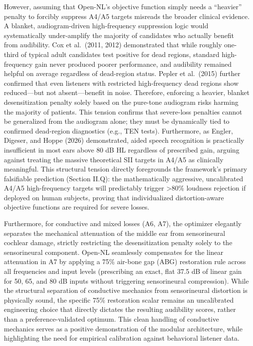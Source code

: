 \documentclass[
  12pt,
]{article}
\begin{document}
However, assuming that Open-NL's objective function simply needs a
``heavier'' penalty to forcibly suppress A4/A5 targets misreads the
broader clinical evidence. A blanket, audiogram-driven high-frequency
suppression logic would systematically under-amplify the majority of
candidates who actually benefit from audibility. Cox et al.~(2011, 2012)
demonstrated that while roughly one-third of typical adult candidates
test positive for dead regions, standard high-frequency gain never
produced poorer performance, and audibility remained helpful on average
regardless of dead-region status. Pepler et al.~(2015) further confirmed
that even listeners with restricted high-frequency dead regions show
reduced---but not absent---benefit in noise. Therefore, enforcing a
heavier, blanket desensitization penalty solely based on the pure-tone
audiogram risks harming the majority of patients. This tension confirms
that severe-loss penalties cannot be generalized from the audiogram
alone; they must be dynamically tied to confirmed dead-region
diagnostics (e.g., TEN tests). Furthermore, as Engler, Digeser, and
Hoppe (2026) demonstrated, aided speech recognition is practically
insufficient in most ears above 80 dB HL regardless of prescribed gain,
arguing against treating the massive theoretical SII targets in A4/A5 as
clinically meaningful. This structural tension directly foregrounds the
framework's primary falsifiable prediction (Section II.Q): the
mathematically aggressive, uncalibrated A4/A5 high-frequency targets
will predictably trigger \textgreater80\% loudness rejection if deployed
on human subjects, proving that individualized distortion-aware
objective functions are required for severe losses.

Furthermore, for conductive and mixed losses (A6, A7), the optimizer
elegantly separates the mechanical attenuation of the middle ear from
sensorineural cochlear damage, strictly restricting the desensitization
penalty solely to the sensorineural component. Open-NL seamlessly
compensates for the linear attenuation in A7 by applying a 75\% air-bone
gap (ABG) restoration rule across all frequencies and input levels
(prescribing an exact, flat 37.5 dB of linear gain for 50, 65, and 80 dB
inputs without triggering sensorineural compression). While the
structural separation of conductive mechanics from sensorineural
distortion is physically sound, the specific 75\% restoration scalar
remains an uncalibrated engineering choice that directly dictates the
resulting audibility scores, rather than a preference-validated optimum.
This clean handling of conductive mechanics serves as a positive
demonstration of the modular architecture, while highlighting the need
for empirical calibration against behavioral listener data.
\end{document}
